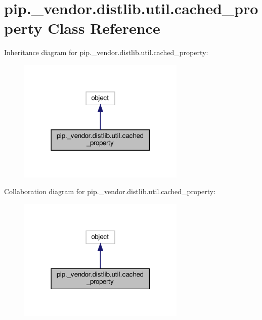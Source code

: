 \hypertarget{classpip_1_1__vendor_1_1distlib_1_1util_1_1cached__property}{}\section{pip.\+\_\+vendor.\+distlib.\+util.\+cached\+\_\+property Class Reference}
\label{classpip_1_1__vendor_1_1distlib_1_1util_1_1cached__property}


Inheritance diagram for pip.\+\_\+vendor.\+distlib.\+util.\+cached\+\_\+property\+:
\nopagebreak
\begin{figure}[H]
\begin{center}
\leavevmode
\includegraphics[width=226pt]{classpip_1_1__vendor_1_1distlib_1_1util_1_1cached__property__inherit__graph}
\end{center}
\end{figure}


Collaboration diagram for pip.\+\_\+vendor.\+distlib.\+util.\+cached\+\_\+property\+:
\nopagebreak
\begin{figure}[H]
\begin{center}
\leavevmode
\includegraphics[width=226pt]{classpip_1_1__vendor_1_1distlib_1_1util_1_1cached__property__coll__graph}
\end{center}
\end{figure}
